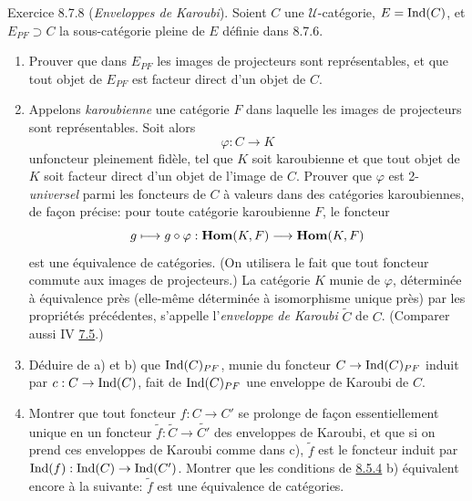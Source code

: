 \documentclass[10pt]{../fichiers-configuration-latex/smfart}
\def\labelenumi{(\theenumi)}
\begin{document}
\begin{enonce*}[remark]{Exercice 8.7.8}
(\emph{Enveloppes de Karoubi}). Soient $C$ une
$𝒰$-catégorie, $E=\operatorname{Ind}(C)$, et $E_{PF}\supset C$ %
la sous-catégorie pleine de $E$ définie dans 8.7.6.
\begin{enumerate}
\renewcommand{\theenumi}{\alph{enumi}}
\renewcommand{\labelenumi}{\theenumi)}
\item Prouver que dans $E_{PF}$ les images de projecteurs sont
représentables, et que tout objet de $E_{PF}$ est facteur direct
d'un objet de $C$.

\item Appelons \emph{karoubienne} une catégorie $F$ dans laquelle
les images de projecteurs sont représentables. Soit alors
$$
\varphi:C\longrightarrow K
$$
un\pageoriginale foncteur pleinement fidèle, tel que $K$ soit
karoubienne et que tout objet de $K$ soit facteur direct d'un objet
de l'image de $C$. Prouver que $\varphi$ est 2-\emph{universel}
parmi les foncteurs de $C$ à valeurs dans des catégories
karoubiennes, de façon précise: pour toute catégorie karoubienne
$F$, le foncteur
$$
g\longmapsto g\circ \varphi :\operatorname{\mathbf{Hom}}(K,F)\longrightarrow \operatorname{\mathbf{Hom}}(K,F)
$$
est une équivalence de catégories. (On utilisera le fait que tout
foncteur commute aux images de projecteurs.) La catégorie $K$ munie
de $\varphi$, déterminée à équivalence près (elle-même déterminée à
isomorphisme unique près) par les propriétés précédentes, s'appelle
l'\emph{enveloppe de Karoubi} $\widetilde{C}$ de $C$. (Comparer
aussi IV \hyperref[I.cor7.5]{7.5}.)

\item Déduire de a) et b) que $\operatorname{Ind}(C)_{PF}$, munie du foncteur
$C\rightarrow \operatorname{Ind}(C)_{PF}$ induit par $c:C\rightarrow \operatorname{Ind}(C)$,
fait de $\operatorname{Ind}(C)_{PF}$ une enveloppe de Karoubi de $C$.

\item Montrer que tout foncteur $f:C\rightarrow C'$ se prolonge de
façon essentiellement unique en un foncteur
$\widetilde{f}:\widetilde{C}\rightarrow\widetilde{C'}$ des
enveloppes de Karoubi, et que si on prend ces enveloppes de Karoubi
comme dans c), $\widetilde{f}$ est le foncteur induit par
$\operatorname{Ind}(f):\operatorname{Ind}(C)\rightarrow \operatorname{Ind}(C')$. Montrer que les conditions de
\hyperref[I.sec8.5.4]{8.5.4} %
b) %
équivalent encore à la suivante: $\widetilde{f}$ est une équivalence
de catégories.
\end{enumerate}
\end{enonce*}
\end{document}
